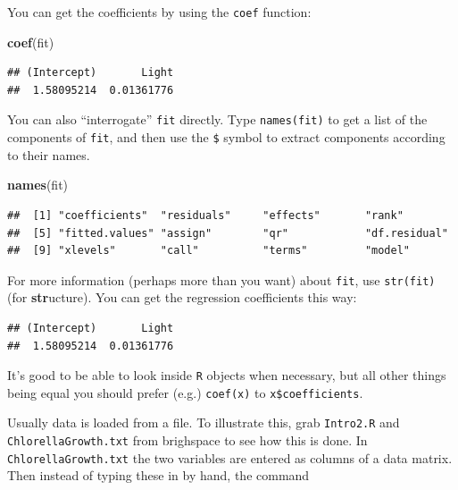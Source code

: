 \documentclass[11pt,]{article}
\newenvironment{Shaded}{\begin{snugshade}}{\end{snugshade}}
\newcommand{\KeywordTok}[1]{\textcolor[rgb]{0.13,0.29,0.53}{\textbf{#1}}}
\newcommand{\NormalTok}[1]{#1}
\newcommand{\OperatorTok}[1]{\textcolor[rgb]{0.81,0.36,0.00}{\textbf{#1}}}
\begin{document}
You can get the coefficients by using the \texttt{coef} function:

\begin{Shaded}
\begin{Highlighting}[]
\KeywordTok{coef}\NormalTok{(fit)}
\end{Highlighting}
\end{Shaded}

\begin{verbatim}
## (Intercept)       Light 
##  1.58095214  0.01361776
\end{verbatim}

You can also ``interrogate'' \texttt{fit} directly. Type \texttt{names(fit)} to get a list of the components of \texttt{fit}, and then use the \texttt{\$} symbol to extract components according to their names.

\begin{Shaded}
\begin{Highlighting}[]
\KeywordTok{names}\NormalTok{(fit)}
\end{Highlighting}
\end{Shaded}

\begin{verbatim}
##  [1] "coefficients"  "residuals"     "effects"       "rank"         
##  [5] "fitted.values" "assign"        "qr"            "df.residual"  
##  [9] "xlevels"       "call"          "terms"         "model"
\end{verbatim}

For more information (perhaps more than you want) about \texttt{fit}, use \texttt{str(fit)} (for \textbf{str}ucture). You can get the regression coefficients this way:

\begin{Shaded}
\end{Shaded}

\begin{verbatim}
## (Intercept)       Light 
##  1.58095214  0.01361776
\end{verbatim}

It's good to be able to look inside \texttt{R} objects when necessary, but all other things being equal you should prefer (e.g.) \texttt{coef(x)} to \texttt{x\$coefficients}.

Usually data is loaded from a file. To illustrate this, grab \texttt{Intro2.R} and \texttt{ChlorellaGrowth.txt} from brighspace to see how this is done. In \texttt{ChlorellaGrowth.txt} the two variables are entered as columns of a data matrix. Then instead of typing these in by hand, the command
\end{document}
